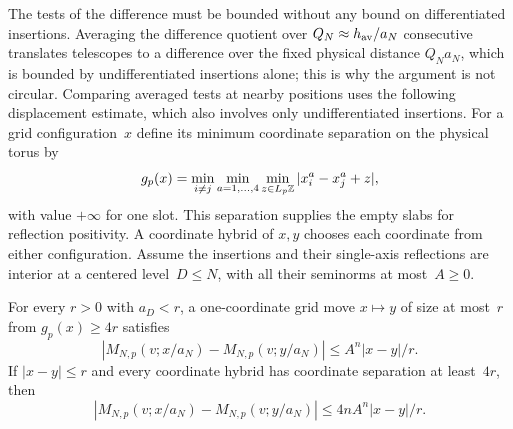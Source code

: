 The tests of the difference must be bounded without any bound on differentiated insertions. Averaging the difference quotient over $Q_N\approx h_{\rm av}/a_N$ consecutive translates telescopes to a difference over the fixed physical distance $Q_Na_N$, which is bounded by undifferentiated insertions alone; this is why the argument is not circular. Comparing averaged tests at nearby positions uses the following displacement estimate, which also involves only undifferentiated insertions. For a grid configuration~$x$ define its minimum coordinate separation on the physical torus by
\begin{equation*}
 g_p(x)=\min_{i\ne j}\min_{a=1,\ldots,4}\min_{z\in L_p\mathbb{Z}}
 |x_i^a-x_j^a+z|,
\end{equation*}
with value $+\infty$ for one slot. This separation supplies the empty slabs for reflection positivity. A coordinate hybrid of $x,y$ chooses each coordinate from either configuration. Assume the insertions and their single-axis reflections are interior at a centered level~$D\le N$, with all their seminorms at most~$A\ge0$.
\begin{lemma}\label{lem:E-displacement}
For every $r>0$ with $a_D<r$, a one-coordinate grid move $x\mapsto y$ of size at most~$r$ from $g_p(x)\ge4r$ satisfies
\begin{equation*}
 |M_{N,p}(v;x/a_N)-M_{N,p}(v;y/a_N)|
 \le A^n|x-y|/r.
\end{equation*}
If $|x-y|\le r$ and every coordinate hybrid has coordinate separation at least~$4r$, then
\begin{equation*}
 |M_{N,p}(v;x/a_N)-M_{N,p}(v;y/a_N)|
 \le4nA^n|x-y|/r.
\end{equation*}
\end{lemma}

